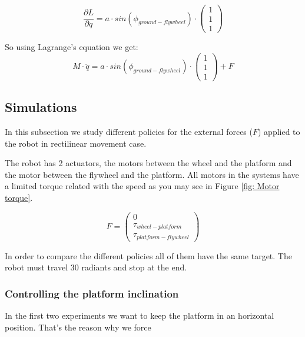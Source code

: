 \begin{equation}
	\frac{\partial L}{\partial q} = a \cdot sin(\phi_{ground-flywheel}) \cdot
	\begin{pmatrix}
		1 \\ 1 \\ 1
	\end{pmatrix}
\end{equation}

So using Lagrange's equation we get:
\begin{equation}
	\boxed{
		M \cdot \ddot{q} = a \cdot sin(\phi_{ground-flywheel}) \cdot
		\begin{pmatrix}
			1 \\ 1 \\ 1
		\end{pmatrix} + F
	}
\end{equation}


\subsection{Simulations}
In this subsection we study different policies for the external forces
($F$) applied to the robot in rectilinear movement case.

The robot has 2 actuators, the motors between the wheel and the platform
and the motor between the flywheel and the platform.
All motors in the systems  have a limited torque related with the
speed as you may see in Figure \ref{fig: Motor torque}.

\begin{equation}
	\boxed{
		F =
		\begin{pmatrix}
			0 \\ \tau_{wheel-platform} \\ \tau_{platform-flywheel}
		\end{pmatrix}
	}
\end{equation}

In order to compare the different policies all of them have the same target.
The robot must travel 30 radiants and stop at the end.

\subsubsection{Controlling the platform inclination}
In the first two experiments we want to keep the platform in an horizontal position.
That's the reason why we force 

